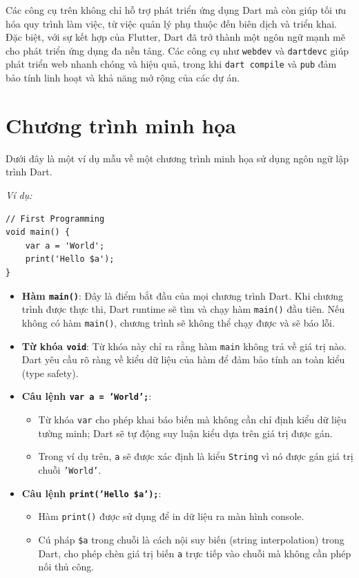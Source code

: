 \documentclass[../DoAn.tex]{subfiles}
\numberwithin{figure}{chapter}
\begin{document}
\begin{itemize}
Các công cụ trên không chỉ hỗ trợ phát triển ứng dụng Dart mà còn giúp tối ưu hóa quy trình làm việc, từ việc quản lý phụ thuộc đến biên dịch và triển khai. Đặc biệt, với sự kết hợp của Flutter, Dart đã trở thành một ngôn ngữ mạnh mẽ cho phát triển ứng dụng đa nền tảng. Các công cụ như \texttt{webdev} và \texttt{dartdevc} giúp phát triển web nhanh chóng và hiệu quả, trong khi \texttt{dart compile} và \texttt{pub} đảm bảo tính linh hoạt và khả năng mở rộng của các dự án.

\section{Chương trình minh họa}
Dưới đây là một ví dụ mẫu về một chương trình minh họa sử dụng ngôn ngữ lập trình Dart.

\textit{Ví dụ:}
\begin{lstlisting}
// First Programming
void main() {
    var a = 'World';
    print('Hello $a');
} 
\end{lstlisting}

\begin{itemize}
    \item \textbf{Hàm \texttt{main()}}: Đây là điểm bắt đầu của mọi chương trình Dart. Khi chương trình được thực thi, Dart runtime sẽ tìm và chạy hàm \texttt{main()} đầu tiên. Nếu không có hàm \texttt{main()}, chương trình sẽ không thể chạy được và sẽ báo lỗi.
    
    \item \textbf{Từ khóa \texttt{void}}: Từ khóa này chỉ ra rằng hàm \texttt{main} không trả về giá trị nào. Dart yêu cầu rõ ràng về kiểu dữ liệu của hàm để đảm bảo tính an toàn kiểu (type safety).
    
    \item \textbf{Câu lệnh \texttt{var a = 'World';}}: 
    \begin{itemize}
        \item Từ khóa \texttt{var} cho phép khai báo biến mà không cần chỉ định kiểu dữ liệu tường minh; Dart sẽ tự động suy luận kiểu dựa trên giá trị được gán.
        \item Trong ví dụ trên, \texttt{a} sẽ được xác định là kiểu \texttt{String} vì nó được gán giá trị chuỗi \texttt{'World'}.
    \end{itemize}
    
    \item \textbf{Câu lệnh \texttt{print('Hello \$a');}}:
    \begin{itemize}
        \item Hàm \texttt{print()} được sử dụng để in dữ liệu ra màn hình console.
        \item Cú pháp \texttt{\$a} trong chuỗi là cách nội suy biến (string interpolation) trong Dart, cho phép chèn giá trị biến \texttt{a} trực tiếp vào chuỗi mà không cần phép nối thủ công.
    \end{itemize}
\end{itemize}


\end{itemize}
\end{document}
